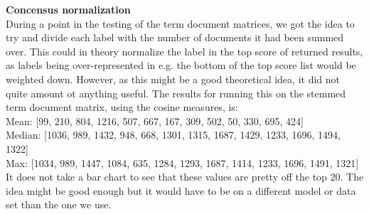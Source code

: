 \textbf{Concensus normalization} \\
During a point in the testing of the term document matrices, we got the idea to try and divide each label with the number of documents it had been summed over. This could in theory normalize the label in the top score of returned results, as labels being over-represented in e.g. the bottom of the top score list would be weighted down. However, as this might be a good theoretical idea, it did not quite amount ot anything useful. The results for running this on the stemmed term document matrix, using the cosine measures, is: \\
{\small
Mean: [99, 210, 804, 1216, 507, 667, 167, 309, 502, 50, 330, 695, 424] \\
Median: [1036, 989, 1432, 948, 668, 1301, 1315, 1687, 1429, 1233, 1696, 1494, 1322] \\
Max: [1034, 989, 1447, 1084, 635, 1284, 1293, 1687, 1414, 1233, 1696, 1491, 1321] \\
}
It does not take a bar chart to see that these values are pretty off the top 20. The idea might be good enough but it would have to be on a different model or data set than the one we use.
